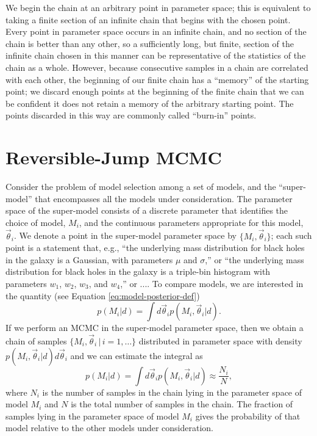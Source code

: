 \documentclass[preprint]{aastex}
\newcommand{\vtheta}{\vec{\theta}}
\begin{document}
We begin the chain at an arbitrary point in parameter space; this is
equivalent to taking a finite section of an infinite chain that begins
with the chosen point.  Every point in parameter space occurs in an
infinite chain, and no section of the chain is better than any other,
so a sufficiently long, but finite, section of the infinite chain
chosen in this manner can be representative of the statistics of the
chain as a whole.  However, because consecutive samples in a chain are
correlated with each other, the beginning of our finite chain has a
``memory'' of the starting point; we discard enough points at the
beginning of the finite chain that we can be confident it does not
retain a memory of the arbitrary starting point.  The points discarded
in this way are commonly called ``burn-in'' points.

\section{Reversible-Jump MCMC}
\label{sec:reversible-jump-mcmc}

Consider the problem of model selection among a set of models, and the
``super-model'' that encompasses all the models under consideration.
The parameter space of the super-model consists of a discrete
parameter that identifies the choice of model, $M_i$, and the
continuous parameters appropriate for this model, $\vtheta_i$.  We
denote a point in the super-model parameter space by $\{M_i,
\vtheta_i\}$; each such point is a statement that, e.g., ``the
underlying mass distribution for black holes in the galaxy is a
Gaussian, with parameters $\mu$ and $\sigma$,'' or ``the underlying
mass distribution for black holes in the galaxy is a triple-bin
histogram with parameters $w_1$, $w_2$, $w_3$, and $w_4$,'' or ....
To compare models, we are interested in the quantity (see Equation
\eqref{eq:model-posterior-def})
\begin{equation}
  p(M_i|d) = \int d\vtheta_i p(M_i, \vtheta_i|d).
\end{equation}
If we perform an MCMC in the super-model parameter space, then we
obtain a chain of samples $\{M_i, \vtheta_i \, | \, i = 1, \ldots\}$
distributed in parameter space with density $p(M_i,\vtheta_i|d)
d\vtheta_i$ and we can estimate the integral as
\begin{equation}
    p(M_i|d) = \int d\vtheta_i p(M_i, \vtheta_i|d) \approx \frac{N_i}{N},
\end{equation}
where $N_i$ is the number of samples in the chain lying in the
parameter space of model $M_i$ and $N$ is the total number of samples
in the chain.  The fraction of samples lying in the parameter space of
model $M_i$ gives the probability of that model relative to the other
models under consideration.
\end{document}

